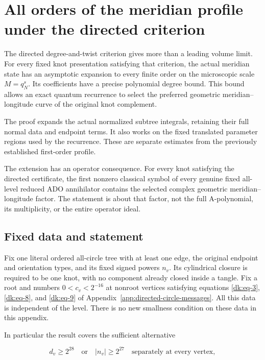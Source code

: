 \chapter{All orders of the meridian profile under the directed criterion}
\label{app:directed-all-orders}

The directed degree-and-twist criterion gives more than a leading volume limit. For every fixed knot presentation satisfying that criterion, the actual meridian state has an asymptotic expansion to every finite order on the microscopic scale \(M=q_N^s\). Its coefficients have a precise polynomial degree bound. This bound allows an exact quantum recurrence to select the preferred geometric meridian--longitude curve of the original knot complement.

The proof expands the actual normalized subtree integrals, retaining their full normal data and endpoint terms. It also works on the fixed translated parameter regions used by the recurrence. These are separate estimates from the previously established first-order profile.

The extension has an operator consequence. For every knot satisfying the directed certificate, the first nonzero classical symbol of every genuine fixed all-level reduced ADO annihilator contains the selected complex geometric meridian--longitude factor. The statement is about that factor, not the full A-polynomial, its multiplicity, or the entire operator ideal.

\section{Fixed data and statement}\label{dao:sec-1}

Fix one literal ordered all-circle tree with at least one edge, the original endpoint and orientation types, and its fixed signed powers \(n_v\). Its cylindrical closure is required to be one knot, with no component already closed inside a tangle. Fix a root and numbers \(0<c_v<2^{-16}\) at nonroot vertices satisfying equations \eqref{dk:eq-3}, \eqref{dk:eq-8}, and \eqref{dk:eq-9} of Appendix~\ref{app:directed-circle-messages}. All this data is independent of the level. There is no new smallness condition on these data in this appendix.

In particular the result covers the sufficient alternative

\begin{equation}\label{dao:eq-1}
d_v\ge 2^{28}\quad\text{or}\quad |n_v|\ge2^{27}
 \quad\text{separately at every vertex},
\end{equation}

